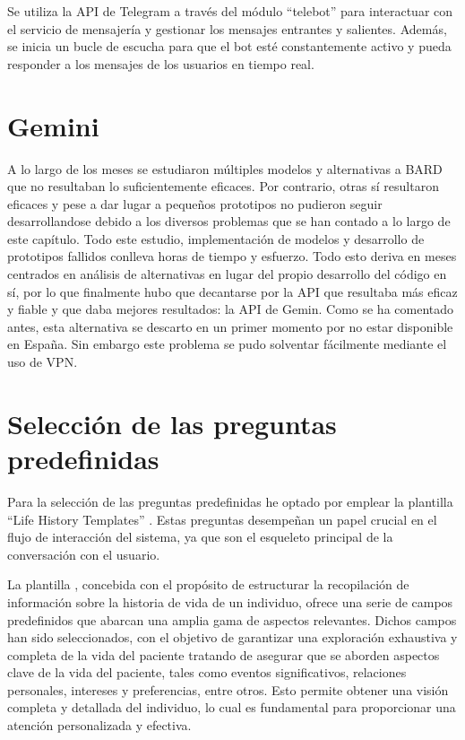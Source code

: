 Se utiliza la API de Telegram a través del módulo ``telebot'' para interactuar con el servicio de mensajería y gestionar los mensajes entrantes y salientes. Además, se inicia un bucle de escucha para que el bot esté constantemente activo y pueda responder a los mensajes de los usuarios en tiempo real.

\section{Gemini}
A lo largo de los meses se estudiaron múltiples modelos y alternativas a BARD que no resultaban lo suficientemente eficaces. Por contrario, otras sí resultaron eficaces y pese a dar lugar a pequeños prototipos no pudieron seguir desarrollandose debido a los diversos problemas que se han contado a lo largo de este capítulo. Todo este estudio, implementación de modelos y desarrollo de prototipos fallidos conlleva horas de tiempo y esfuerzo. Todo esto deriva en meses centrados en análisis de alternativas en lugar del propio desarrollo del código en sí, por lo que finalmente hubo que decantarse por la API que resultaba más eficaz y fiable y que daba mejores resultados: la API de Gemin. Como se ha comentado antes, esta alternativa se descarto en un primer momento por no estar disponible en España. Sin embargo este problema se pudo solventar fácilmente mediante el uso de VPN.


\section{Selección de las preguntas predefinidas}
Para la selección de las preguntas predefinidas he optado por emplear la plantilla ``Life History Templates'' \cite{DUK89b}. Estas preguntas desempeñan un papel crucial en el flujo de interacción del sistema, ya que son el esqueleto principal de la conversación con el usuario. 

La plantilla \cite{DUK89b}, concebida con el propósito de estructurar la recopilación de información sobre la historia de vida de un individuo, ofrece una serie de campos predefinidos que abarcan una amplia gama de aspectos relevantes. Dichos campos han sido seleccionados, con el objetivo de garantizar una exploración exhaustiva y completa de la vida del paciente tratando de asegurar que se aborden aspectos clave de la vida del paciente, tales como eventos significativos, relaciones personales, intereses y preferencias, entre otros. Esto permite obtener una visión completa y detallada del individuo, lo cual es fundamental para proporcionar una atención personalizada y efectiva.

